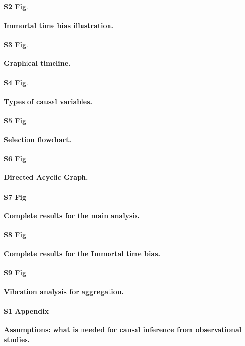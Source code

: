 \documentclass[10pt,letterpaper]{article}
\begin{document}
\paragraph*{S2 Fig.}
\label{apd:immortal_time_bias}
{\bf Immortal time bias illustration.}

\paragraph*{S3 Fig.}
\label{apd:graphical_timeline}
{\bf Graphical timeline.}

\paragraph*{S4 Fig.}
\label{apd:causal_variables}
{\bf Types of causal variables.}

\paragraph*{S5 Fig}
\label{apd:selection_flowchart}
{\bf Selection flowchart.}

\paragraph*{S6 Fig}
\label{apd:causal_diagram_albumin}
{\bf Directed Acyclic Graph.}

\paragraph*{S7 Fig}
\label{apd:detailed_results}
{\bf Complete results for the main analysis.}

\paragraph*{S8 Fig}
\label{apd:detailed_results_itb}
{\bf Complete results for the Immortal time bias.}

\paragraph*{S9 Fig}
\label{apd:vibration_analysis_for_aggregation}
{\bf Vibration analysis for aggregation.}

\paragraph*{S1 Appendix}
\label{apd:causal_assumptions}
{\bf Assumptions: what is needed for causal inference from observational studies.}
\end{document}
